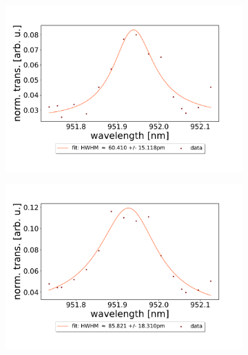 \begin{figure}[h!] \ContinuedFloat
    \centering
    \begin{subfigure}[b]{0.49\textwidth}
        \includegraphics[width=\textwidth]{figures/results/double fano fits/20250326/33um_M3:M5_fit_13.pdf}
        \caption{}
        \label{fig:33um_M3:M5_fit_13}
    \end{subfigure}
    \begin{subfigure}[b]{0.49\textwidth}
        \includegraphics[width=\textwidth]{figures/results/double fano fits/20250326/33um_M3:M5_fit_14.pdf}
        \caption{}
        \label{fig:33um_M3:M5_fit_14}
    \end{subfigure}
    \begin{subfigure}[b]{0.49\textwidth}

\end{subfigure}
\end{figure}
